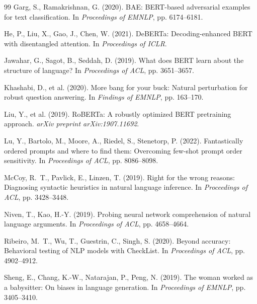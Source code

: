 \documentclass[11pt]{article}
\begin{document}
\begin{thebibliography}{99}
Garg, S., Ramakrishnan, G. (2020).
\newblock BAE: BERT-based adversarial examples for text classification.
\newblock In \textit{Proceedings of EMNLP}, pp. 6174--6181.

He, P., Liu, X., Gao, J., Chen, W. (2021).
\newblock DeBERTa: Decoding-enhanced BERT with disentangled attention.
\newblock In \textit{Proceedings of ICLR}.

Jawahar, G., Sagot, B., Seddah, D. (2019).
\newblock What does BERT learn about the structure of language?
\newblock In \textit{Proceedings of ACL}, pp. 3651--3657.

Khashabi, D., et al. (2020).
\newblock More bang for your buck: Natural perturbation for robust question answering.
\newblock In \textit{Findings of EMNLP}, pp. 163--170.

Liu, Y., et al. (2019).
\newblock RoBERTa: A robustly optimized BERT pretraining approach.
\newblock \textit{arXiv preprint arXiv:1907.11692}.

Lu, Y., Bartolo, M., Moore, A., Riedel, S., Stenetorp, P. (2022).
\newblock Fantastically ordered prompts and where to find them: Overcoming few-shot prompt order sensitivity.
\newblock In \textit{Proceedings of ACL}, pp. 8086--8098.

McCoy, R.~T., Pavlick, E., Linzen, T. (2019).
\newblock Right for the wrong reasons: Diagnosing syntactic heuristics in natural language inference.
\newblock In \textit{Proceedings of ACL}, pp. 3428--3448.

Niven, T., Kao, H.-Y. (2019).
\newblock Probing neural network comprehension of natural language arguments.
\newblock In \textit{Proceedings of ACL}, pp. 4658--4664.

Ribeiro, M.~T., Wu, T., Guestrin, C., Singh, S. (2020).
\newblock Beyond accuracy: Behavioral testing of NLP models with CheckList.
\newblock In \textit{Proceedings of ACL}, pp. 4902--4912.

Sheng, E., Chang, K.-W., Natarajan, P., Peng, N. (2019).
\newblock The woman worked as a babysitter: On biases in language generation.
\newblock In \textit{Proceedings of EMNLP}, pp. 3405--3410.


\end{thebibliography}
\end{document}
